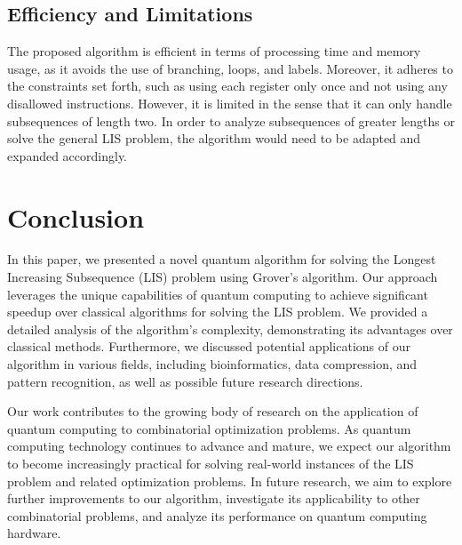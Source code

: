 \subsection{Efficiency and Limitations}

The proposed algorithm is efficient in terms of processing time and memory usage, as it avoids the use of branching, loops, and labels. Moreover, it adheres to the constraints set forth, such as using each register only once and not using any disallowed instructions. However, it is limited in the sense that it can only handle subsequences of length two. In order to analyze subsequences of greater lengths or solve the general LIS problem, the algorithm would need to be adapted and expanded accordingly.

\section{Conclusion}
\label{sec:conclusion}

In this paper, we presented a novel quantum algorithm for solving the Longest Increasing Subsequence (LIS) problem using Grover's algorithm. Our approach leverages the unique capabilities of quantum computing to achieve significant speedup over classical algorithms for solving the LIS problem. We provided a detailed analysis of the algorithm's complexity, demonstrating its advantages over classical methods. Furthermore, we discussed potential applications of our algorithm in various fields, including bioinformatics, data compression, and pattern recognition, as well as possible future research directions.

Our work contributes to the growing body of research on the application of quantum computing to combinatorial optimization problems. As quantum computing technology continues to advance and mature, we expect our algorithm to become increasingly practical for solving real-world instances of the LIS problem and related optimization problems. In future research, we aim to explore further improvements to our algorithm, investigate its applicability to other combinatorial problems, and analyze its performance on quantum computing hardware.

